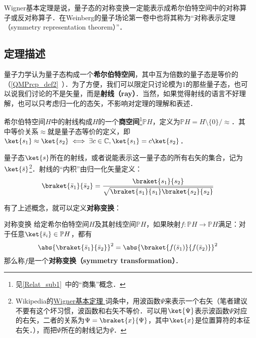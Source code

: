 





Wigner基本定理是说，量子态的对称变换一定能表示成希尔伯特空间中的对称算子或反对称算子．在Weinberg的量子场论第一卷\cite{WeinbergQFT1}中也将其称为“对称表示定理（symmetry representation theorem）”．

\subsection{定理描述}

量子力学认为量子态构成一个\textbf{希尔伯特空间}，其中互为倍数的量子态是等价的（\autoref{QMPrcp_def2}~）．为了方便，我们可以限定只讨论模为$1$的那些量子态，也可以说我们讨论的不是矢量，而是\textbf{射线（ray）}．当然，如果觉得射线的语言不好理解，也可以只考虑归一化的态矢，不影响对定理的理解和表述．

希尔伯特空间$H$中的射线构成$H$的一个\textbf{商空间}\footnote{见\autoref{Relat_sub1}~中的“商集”概念．}$\mathbb{P}H$，定义为${\displaystyle \mathbb {P} H=H\setminus \{0\}/{\approx }}$．其中等价关系$\approx$就是量子态等价的定义，即$\ket{s_1}\approx\ket{s_2}\iff \exists c\in\mathbb{C}, \ket{s_1}=c\ket{s_2}$．

量子态$\ket{s}$所在的射线，或者说能表示这一量子态的所有右矢的集合，记为$\ket{\bar{s}}$\footnote{Wikipedia的\href{https://en.wikipedia.org/wiki/Wigner_theorem}{Wigner基本定理
}词条中，用波函数$\Psi$来表示一个右矢（笔者建议不要有这个坏习惯，波函数和右矢不等价．可以用$\ket{\Psi}$表示波函数$\Psi$对应的右矢，二者的关系为$\Psi=\braket{x}{\Psi}$，其中$\ket{x}$是位置算符的本征右矢．），而把$\Psi$所在的射线记为$\underline{\Psi}$．}．射线的“内积”由归一化矢量定义：
\begin{equation}
\braket{\bar{s}_1}{\bar{s}_2} = \frac{\braket{s_1}{s_2}}{\sqrt{\braket{s_1}{s_1}\braket{s_2}{s_2}}}
\end{equation}

有了上述概念，就可以定义\textbf{对称变换}：

\begin{definition}{对称变换}\label{WigThe_def1}
给定希尔伯特空间$H$及其射线空间$\mathbb{P}H$，如果映射$f:\mathbb{P}H\to\mathbb{P}H$满足：对于任意$\ket{\bar{s}_i}\in\mathbb{P}H$，都有
\begin{equation}\label{WigThe_eq1}
\abs{\braket{\bar{s}_1}{\bar{s}_2}}^2 = \abs{\braket{f(\bar{s}_1)}{f(\bar{s}_2)}}^2
\end{equation}
那么称$f$是一个\textbf{对称变换（symmetry transformation）}．
\end{definition}

